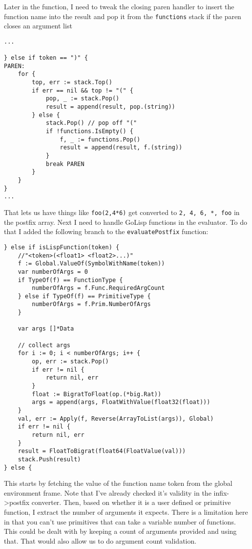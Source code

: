 \documentclass{scrartcl}
\begin{document}
Later in the function, I need to tweak the closing paren handler to
insert the function name into the result and pop it from
the \texttt{functions} stack if the paren closes an argument list

\begin{verbatim}...

} else if token == ")" {
PAREN:
    for {
        top, err := stack.Top()
        if err == nil && top != "(" {
            pop, _ := stack.Pop()
            result = append(result, pop.(string))
        } else {
            stack.Pop() // pop off "("
            if !functions.IsEmpty() {
                f, _ := functions.Pop()
                result = append(result, f.(string))
            }
            break PAREN
        }
    }
}
...
\end{verbatim}

That lets us have things like \texttt{foo(2,4*6)} get converted to \texttt{2, 4, 6,
*, foo} in the postfix array. Next I need to handle GoLisp functions
in the evaluator. To do that I added the following branch to the
\texttt{evaluatePostfix} function:

\begin{verbatim}} else if isLispFunction(token) {
    //"<token>(<float1> <float2>...)"
    f := Global.ValueOf(SymbolWithName(token))
    var numberOfArgs = 0
    if TypeOf(f) == FunctionType {
        numberOfArgs = f.Func.RequiredArgCount
    } else if TypeOf(f) == PrimitiveType {
        numberOfArgs = f.Prim.NumberOfArgs
    }

    var args []*Data

    // collect args
    for i := 0; i < numberOfArgs; i++ {
        op, err := stack.Pop()
        if err != nil {
            return nil, err
        }
        float := BigratToFloat(op.(*big.Rat))
        args = append(args, FloatWithValue(float32(float)))
    }
    val, err := Apply(f, Reverse(ArrayToList(args)), Global)
    if err != nil {
        return nil, err
    }
    result = FloatToBigrat(float64(FloatValue(val)))
    stack.Push(result)
} else {
\end{verbatim}

This starts by fetching the value of the function name token from the
global environment frame. Note that I've already checked it's validity
in the infix-\textgreater{}postfix converter. Then, based on whether it is a user
defined or primitive function, I extract the number of arguments it
expects. There is a limitation here in that you can't use primitives
that can take a variable number of functions. This could be dealt with
by keeping a count of arguments provided and using that. That would
also allow us to do argument count validation.
\end{document}
